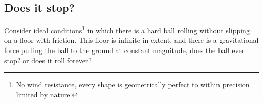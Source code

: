 \subsection{Does it stop?}
Consider ideal conditions\footnote{No wind resistance, every shape is geometrically perfect to within precision limited by nature.} in which there is a hard ball rolling without slipping on a floor with friction. This floor is infinite in extent, and there is a gravitational force pulling the ball to the ground at constant magnitude, does the ball ever stop? or does it roll forever?\\
